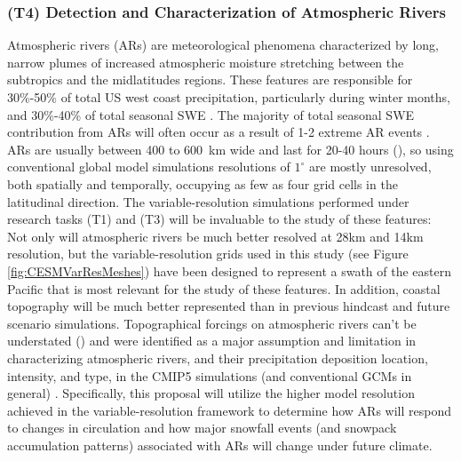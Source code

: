 \documentclass[11pt]{article}
\begin{document}
\subsubsection{(T4) Detection and Characterization of Atmospheric Rivers}

Atmospheric rivers (ARs) are meteorological phenomena characterized by long, narrow plumes of increased atmospheric moisture stretching between the subtropics and the midlatitudes regions.  These features are responsible for 30\%-50\% of total US west coast precipitation, particularly during winter months, and 30\%-40\% of total seasonal SWE \citep{dettinger2011atmospheric}.  The majority of total seasonal SWE contribution from ARs will often occur as a result of 1-2 extreme AR events \citep{guan2010extreme}.  ARs are usually between 400 to 600\ km wide and last for 20-40 hours (\cite{gimeno2014atmospheric}), so using conventional global model simulations resolutions of $1^\circ$ are mostly unresolved, both spatially and temporally, occupying as few as four grid cells in the latitudinal direction.  The variable-resolution simulations performed under research tasks (T1) and (T3) will be invaluable to the study of these features: Not only will atmospheric rivers be much better resolved at 28km and 14km resolution, but the variable-resolution grids used in this study (see Figure \ref{fig:CESMVarResMeshes}) have been designed to represent a swath of the eastern Pacific that is most relevant for the study of these features.  In addition, coastal topography will be much better represented than in previous hindcast and future scenario simulations.  Topographical forcings on atmospheric rivers can't be understated (\cite{leung2009atmospheric, dettinger2011atmospheric, rutz2014climatological, gimeno2014atmospheric}) and were identified as a major assumption and limitation in characterizing atmospheric rivers, and their precipitation deposition location, intensity, and type, in the CMIP5 simulations (and conventional GCMs in general) \citep{dettinger2011atmospheric}.  Specifically, this proposal will utilize the higher model resolution achieved in the variable-resolution framework to determine how ARs will respond to changes in circulation and how major snowfall events (and snowpack accumulation patterns) associated with ARs will change under future climate.
\end{document}

